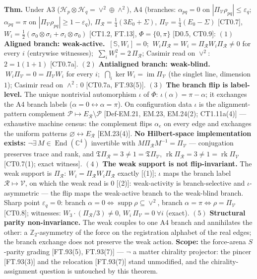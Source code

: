 \begin{theorem}\label{tag:FT-101}
\textbf{Thm.} Under A3 ($\mathcal H_p\otimes\mathcal H_q=\vee^2\oplus\wedge^2$), A4 (branches: $\alpha_{pq}=0$ on $|\Pi_{\mathcal V}\rho_{pq}|\le\varepsilon_q$; $\alpha_{pq}=\pi$ on $|\Pi_{\mathcal V}\rho_{pq}|\ge1-\varepsilon_q$), $\Pi_{\mathcal R}=\tfrac14(3E_0+\Sigma)$, $\Pi_{\mathcal V}=\tfrac14(E_0-\Sigma)$ [CT0.7], $W_i=\tfrac12(\sigma_0\otimes\sigma_i+\sigma_i\otimes\sigma_0)$ [CT1.2, FT.13], $\Phi=\{0,\pi\}$ [D0.5, CT0.9]: $(1)$ \textbf{Aligned branch: weak-active.} $\ [\mathbb S,W_i]=0$; $\ W_i\Pi_{\mathcal R}=W_i=\Pi_{\mathcal R}W_i\Pi_{\mathcal R}\ne0$ for every $i$ (entrywise witnesses); $\ \sum_iW_i^2=2\,\Pi_{\mathcal R}$; Casimir read on $\vee^2$: $2=1(1{+}1)$ [CT0.7a]. $(2)$ \textbf{Antialigned branch: weak-blind.} $\ W_i\Pi_{\mathcal V}=0=\Pi_{\mathcal V}W_i$ for every $i$; $\ \bigcap_i\ker W_i=\operatorname{im}\Pi_{\mathcal V}$ (the singlet line, dimension $1$); Casimir read on $\wedge^2$: $0$ [CT0.7a, FT.93(5)]. $(3)$ \textbf{The branch flip is label-level.} The unique nontrivial automorphism $\iota$ of $\Phi$: $\iota(\alpha)=\pi-\alpha$; it exchanges the A4 branch labels ($\alpha=0\leftrightarrow\alpha=\pi$). On configuration data $\iota$ is the alignment-pattern complement $\mathcal P\mapsto E_{\mathcal R}\setminus\mathcal P$ [Def-EM.21, EM.23, EM.24(2); CT1.11a(4)] — exhaustive machine census: the complement flips $\alpha_e$ on every edge and exchanges the uniform patterns $\varnothing\leftrightarrow E_{\mathcal R}$ [EM.23(4)]. \textbf{No Hilbert-space implementation exists:} $\neg\exists\,M\in\operatorname{End}(\mathbb C^4)$ invertible with $M\Pi_{\mathcal R}M^{-1}=\Pi_{\mathcal V}$ — conjugation preserves trace and rank, and $\mathfrak T\Pi_{\mathcal R}=3\ne1=\mathfrak T\Pi_{\mathcal V}$, $\operatorname{rk}\Pi_{\mathcal R}=3\ne1=\operatorname{rk}\Pi_{\mathcal V}$ [CT0.7(1); exact witness]. $(4)$ \textbf{The weak support is not flip-invariant.} The weak support is $\Pi_{\mathcal R}$: $W_i=\Pi_{\mathcal R}W_i\Pi_{\mathcal R}$ exactly [(1)]; $\iota$ maps the branch label $\mathcal R\mapsto\mathcal V$, on which the weak read is $0$ [(2)]: weak-activity is branch-selective and $\iota$-asymmetric — the flip maps the weak-active branch to the weak-blind branch. Sharp point $\varepsilon_q=0$: branch $\alpha=0\iff\operatorname{supp}\rho\subseteq\vee^2$, branch $\alpha=\pi\iff\rho=\Pi_{\mathcal V}$ [CT0.8]; witnesses: $W_3\cdot(\Pi_{\mathcal R}/3)\ne0$, $W_i\,\Pi_{\mathcal V}=0\ \forall i$ (exact). $(5)$ \textbf{Structural parity non-invariance.} The weak couples to one A4 branch and annihilates the other: a $\mathbb Z_2$-asymmetry of the force on the registration alphabet of the real edges; the branch exchange does not preserve the weak action. \textbf{Scope:} the force-arena $S$-parity grading [FT.93(5), FT.93(7)] — $\neg$ a matter chirality projector: the pincer [FT.93(3)] and the relocation [FT.93(7)] stand unmodified, and the chirality-assignment question is untouched by this theorem.


\end{theorem}
